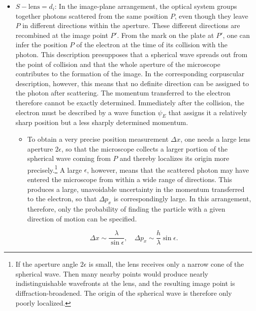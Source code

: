 \documentclass[final,12pt]{article}
\newcommand{\pos}{\ensuremath{x}\xspace}
\newcommand{\mom}{\ensuremath{p_x}\xspace}
\begin{document}
\begin{itemize}
\item $S-\text{lens}=d_i$: In the image-plane arrangement, the optical system groups together photons scattered from the same position $P$, even though they leave $P$ in different directions within the aperture. These different directions are recombined at the image point $P'$. From the mark on the plate at $P'$, one can infer the position $P$ of the electron at the time of its collision with the photon. This description presupposes that a spherical wave spreads out from the point of collision and that the whole aperture of the microscope contributes to the formation of the image. In the corresponding corpuscular description, however, this means that no definite direction can be assigned to the photon after scattering. The momentum transferred to the electron therefore cannot be exactly determined. Immediately after the collision, the electron must be described by a wave function $\psi_E$ that assigns it a relatively sharp position but a less sharply determined momentum.

\begin{itemize}
\item To obtain a very precise position measurement $\Delta \pos$, one needs a large lens aperture $2\epsilon$, so that the microscope collects a larger portion of the spherical wave coming from $P$ and thereby localizes its origin more precisely.\footnote{If the aperture angle $2\epsilon$ is small, the lens receives only a narrow cone of the spherical wave. Then many nearby points would produce nearly indistinguishable wavefronts at the lens, and the resulting image point is diffraction-broadened. The origin of the spherical wave is therefore only poorly localized.} A large $\epsilon$, however, means that the scattered photon may have entered the microscope from within a wide range of directions. This produces a large, unavoidable uncertainty in the momentum transferred to the electron, so that $\Delta \mom$ is correspondingly large. In this arrangement, therefore, only the probability of finding the particle with a given direction of motion can be specified.
\end{itemize}

\begin{equation*}
\Delta \pos \sim \frac{\lambda}{\sin\epsilon}, \quad \Delta \mom \sim \frac{h}{\lambda}\sin\epsilon.
\end{equation*}


\end{itemize}
\end{document}
